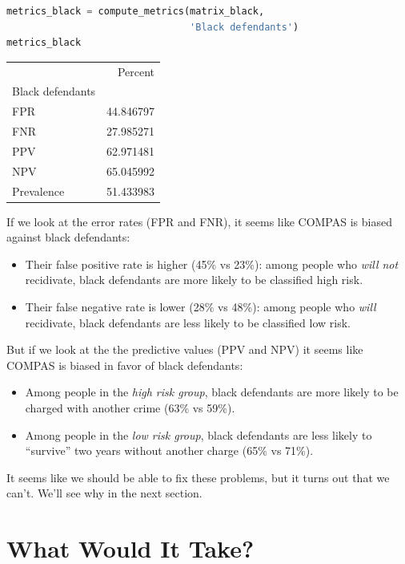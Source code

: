 \begin{lstlisting}[language=Python,style=source]
metrics_black = compute_metrics(matrix_black, 
                                'Black defendants')
metrics_black
\end{lstlisting}

\begin{tabular}{lr}
\toprule
{} &    Percent \\
Black defendants &            \\
\midrule
FPR              &  44.846797 \\
FNR              &  27.985271 \\
PPV              &  62.971481 \\
NPV              &  65.045992 \\
Prevalence       &  51.433983 \\
\bottomrule
\end{tabular}

If we look at the error rates (FPR and FNR), it seems like COMPAS is
biased against black defendants:

\begin{itemize}
\item
  Their false positive rate is higher (45\% vs 23\%): among people who
  \emph{will not} recidivate, black defendants are more likely to be
  classified high risk.
\item
  Their false negative rate is lower (28\% vs 48\%): among people who
  \emph{will} recidivate, black defendants are less likely to be
  classified low risk.
\end{itemize}

But if we look at the the predictive values (PPV and NPV) it seems like
COMPAS is biased in favor of black defendants:

\begin{itemize}
\item
  Among people in the \emph{high risk group}, black defendants are more
  likely to be charged with another crime (63\% vs 59\%).
\item
  Among people in the \emph{low risk group}, black defendants are less
  likely to ``survive'' two years without another charge (65\% vs 71\%).
\end{itemize}

It seems like we should be able to fix these problems, but it turns out
that we can't. We'll see why in the next section.

\hypertarget{what-would-it-take}{%
\section{What Would It Take?}\label{what-would-it-take}}

